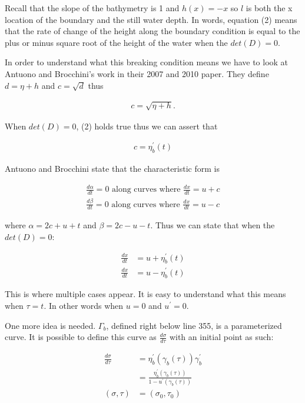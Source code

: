 \documentclass{article}
\begin{document}
Recall that the slope of the bathymetry is 1 and $h(x) = -x$ so $l$ is both the x location of the boundary and the still water depth. In words, equation (2) means that the rate of change of the height along the boundary condition is equal to the plus or minus square root of the height of the water when the $det(D) = 0$.

In order to understand what this breaking condition means we have to look at Antuono and Brocchini's work in their 2007 and 2010 paper. They define $d = \eta + h$ and $c = \sqrt{d}$ thus 

\[
\begin{aligned}
c = \sqrt{\eta + h}.
\end{aligned}
\]

When  $det(D) = 0$, (2) holds true thus we can assert that

\begin{align}
c = \eta_b^\prime(t)
\end{align}

Antuono and Brocchini state that the characteristic form is

\begin{align}
\frac{d \alpha}{dt} = 0 \text{ along curves where } \frac{dx}{dt} = u + c \\
\frac{d \beta}{dt} = 0 \text{ along curves where } \frac{dx}{dt} = u - c
\end{align}


where $\alpha = 2c + u + t$ and $\beta = 2c - u - t$. Thus we can state that when the $det(D) = 0$:


\begin{align}
\frac{dx}{dt} &= u + \eta_b^\prime(t)\\
\frac{dx}{dt} &= u - \eta_b^\prime(t)
\end{align}

This is where multiple cases appear. It is easy to understand what this means when $\tau = t$. In other words when $u = 0$ and $u^\prime = 0$.
 
One more idea is needed. $\Gamma_b$, defined right below line 355, is a parameterized curve. It is possible to define this curve as $\frac{d\sigma}{d\tau}$ with an initial point as such:

\begin{align}
\frac{d\sigma}{d\tau} &= \eta_b^\prime(\gamma_b(\tau))\gamma_b^\prime \\ &= \frac{\eta_b^\prime(\gamma_b(\tau))}{1-u^\prime(\gamma_b(\tau))}\\
(\sigma, \tau) &= (\sigma_0, \tau_0)
\end{align}
\end{document}
